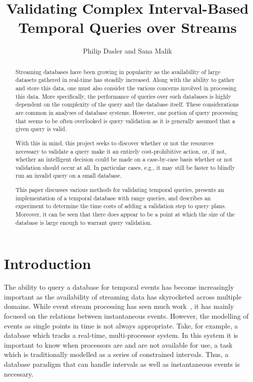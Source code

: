 \documentclass{achemso}
\title{Validating Complex Interval-Based Temporal Queries over Streams}
\author{
Philip Dasler and Sana Malik}
\affiliation{University of Maryland, College Park, MD 20740}
\begin{document}
\maketitle
\begin{abstract}
Streaming databases have been growing in popularity as the availability of large datasets gathered in real-time has steadily increased.  Along with the ability to gather and store this data, one must also consider the various concerns involved in processing this data.  More specifically, the performance of queries over such databases is highly dependent on the complexity of the query and the database itself.  These considerations are common in analyses of database systems.  However, one portion of query processing that seems to be often overlooked is query validation as it is generally assumed that a given query is valid.  

With this in mind, this project seeks to discover whether or not the resources necessary to validate a query make it an entirely cost-prohibitive action, or, if not, whether an intelligent decision could be made on a case-by-case basis whether or not validation should occur at all.  In particular cases, e.g., it may still be faster to blindly run an invalid query on a small database.

This paper discusses various methods for validating temporal queries, presents an implementation of a temporal database with range queries, and describes an experiment to determine the time costs of adding a validation step to query plans.  Moreover, it can be seen that there does appear to be a point at which the size of the database is large enough to warrant query validation.
\end{abstract}
\section{Introduction}
The ability to query a database for temporal events has become increasingly important as the availability of streaming data has skyrocketed across multiple domains. While event stream processing has seen much work~\cite{Agrawal:2008, Akdere:2008, Ding:2008, Wu:2006, Brenna:2007, Li:2009, Li:2010, Liu:2009}, it has mainly focused on the relations between instantaneous events. However, the modelling of events as single points in time is not always appropriate. Take, for example, a database which tracks a real-time, multi-processor system. In this system it is important to know when processors are and are not available for use, a task which is traditionally modelled as a series of constrained intervals. Thus, a database paradigm that can handle intervals as well as instantaneous events is necessary.
\end{document}
